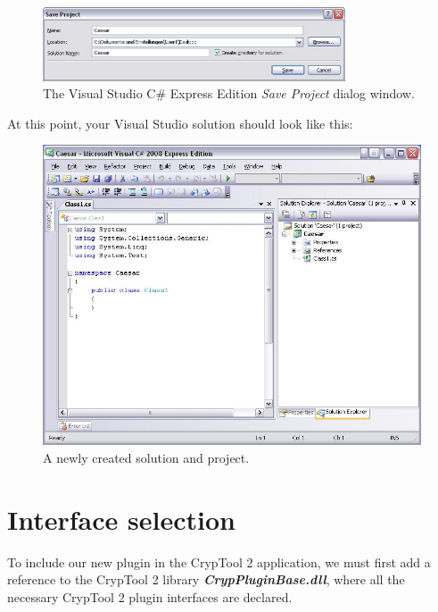 \begin{figure}[h!]
	\centering
		\includegraphics[width=0.80\textwidth]{figures/save_solution_csharp_express.JPG}
	\caption{The Visual Studio C\# Express Edition \textit{Save Project} dialog window.}
	\label{fig:save_solution_csharp_express}
\end{figure}

\noindent At this point, your Visual Studio solution should look like this:

\begin{figure}[h!]
	\centering
		\includegraphics[width=1.00\textwidth]{figures/solution_start_up.jpg}
	\caption{A newly created solution and project.}
	\label{fig:solution_start_up}
\end{figure}
\clearpage

\section{Interface selection}
\label{sec:InterfaceSelection}

To include our new plugin in the CrypTool 2 application, we must first add a reference to the CrypTool 2 library \textbf{\textit{CrypPluginBase.dll}}, where all the necessary CrypTool 2 plugin interfaces are declared.

